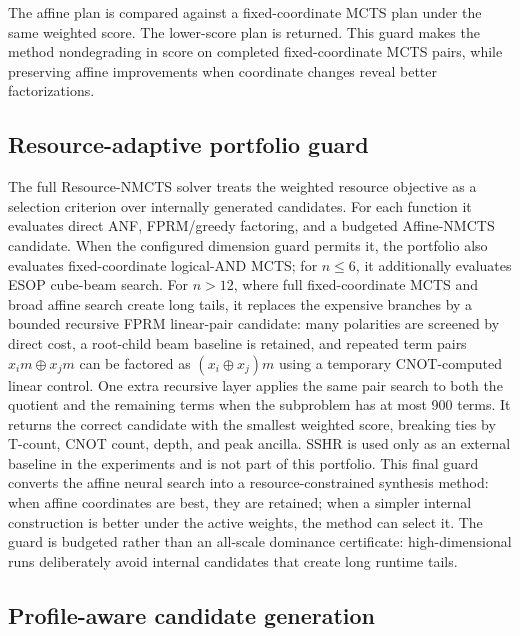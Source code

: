 \documentclass[11pt]{article}
\newcommand{\method}{Resource-NMCTS}
\newcommand{\affinemethod}{Affine-NMCTS}
\begin{document}
The affine plan is compared against a fixed-coordinate MCTS plan under the same
weighted score.  The lower-score plan is returned.  This guard makes the method
nondegrading in score on completed fixed-coordinate MCTS pairs, while preserving
affine improvements when coordinate changes reveal better factorizations.

\subsection{Resource-adaptive portfolio guard}

The full \method{} solver treats the weighted resource objective as a selection
criterion over internally generated candidates.  For each function it evaluates
direct ANF, FPRM/greedy factoring, and a budgeted \affinemethod{} candidate.
When the configured dimension guard permits it, the portfolio also evaluates
fixed-coordinate logical-AND MCTS; for $n\leq 6$, it additionally evaluates
ESOP cube-beam search.  For $n>12$, where full fixed-coordinate MCTS and broad
affine search create long tails, it replaces the expensive branches by a
bounded recursive FPRM linear-pair candidate: many polarities are screened by
direct cost, a root-child beam baseline is retained, and repeated term pairs
$x_i m \oplus x_j m$ can be factored as $(x_i \oplus x_j)m$ using a temporary
CNOT-computed linear control.  One extra recursive layer applies the same pair
search to both the quotient and the remaining terms when the subproblem has at
most 900 terms.
It returns the correct candidate with the smallest
weighted score, breaking ties by T-count, CNOT count, depth, and peak ancilla.
SSHR is used only as an external baseline in the experiments and is not part of
this portfolio.  This final guard converts the affine neural search into a
resource-constrained synthesis method: when affine coordinates are best, they
are retained; when a simpler internal construction is better under the active
weights, the method can select it.  The guard is budgeted rather than an
all-scale dominance certificate: high-dimensional runs deliberately avoid
internal candidates that create long runtime tails.

\subsection{Profile-aware candidate generation}
\end{document}
